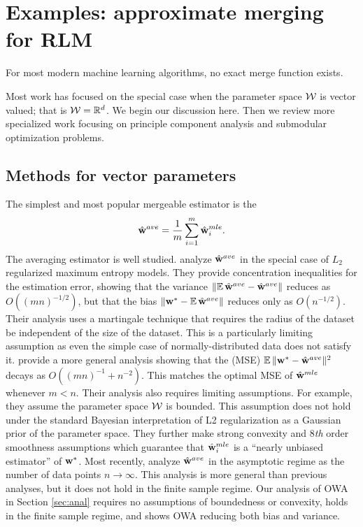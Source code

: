 \documentclass[thesis.tex]{subfiles}
\begin{document}

\section{Examples: approximate merging for RLM}

For most modern machine learning algorithms,
no exact merge function exists.

Most work has focused on the special case when the parameter space ${\mathcal W}$ is vector valued;
that is ${\mathcal W}=\mathbb R^d$.
We begin our discussion here.
Then we review more specialized work focusing on principle component analysis and submodular optimization problems.


\subsection{Methods for vector parameters}
\label{sec:merge:ave}

The simplest and most popular mergeable estimator is the 
\begin{equation}
\hat{\mathbf w}^{ave} = \frac{1}{m}\sum_{i=1}^m \hat{\mathbf w}^{mle}_i
.
\end{equation}
The averaging estimator is well studied.
\citet{mcdonald2009efficient} analyze $\hat{\mathbf w}^{ave}$ in the special case of $L_2$ regularized maximum entropy models.
They provide concentration inequalities for the estimation error,
showing that the variance ${\lVert {\operatorname*{\mathbb E}\hat{\mathbf w}^{ave}-\hat{\mathbf w}^{ave}} \rVert}$ reduces as $O((mn)^{-1/2})$,
but that the bias ${\lVert {{\mathbf w^{*}}-\operatorname*{\mathbb E}\hat{\mathbf w}^{ave}} \rVert}$ reduces only as $O(n^{-1/2})$.
Their analysis uses a martingale technique that requires the radius of the dataset be independent of the size of the dataset.
This is a particularly limiting assumption as even the simple case of
normally-distributed data does not satisfy it.
\citet{zhang2012communication} provide a more general analysis showing that the  (MSE) $\operatorname*{\mathbb E}{\lVert {{\mathbf w^{*}}-\hat{\mathbf w}^{ave}} \rVert}{}^2$ decays as $O((mn)^{-1} + n^{-2})$.
This matches the optimal MSE of $\hat{\mathbf w}^{mle}$ whenever $m<n$.
Their analysis also requires limiting assumptions.
For example, they assume the parameter space ${\mathcal W}$ is bounded.
This assumption does not hold under the standard Bayesian interpretation of L2 regularization as a Gaussian prior of the parameter space.
They further make strong convexity and 8\emph{th} order smoothness assumptions which guarantee that $\hat{\mathbf w}^{mle}_i$ is a ``nearly unbiased estimator'' of ${\mathbf w^{*}}$.
Most recently, \citet{rosenblatt2016optimality} analyze $\hat{\mathbf w}^{ave}$ in the asymptotic regime as the number of data points $n\to\infty$.
This analysis is more general than previous analyses, but it does not hold in the finite sample regime.
Our analysis of OWA in Section \ref{sec:anal} requires no assumptions of boundedness or convexity, holds in the finite sample regime, and shows OWA reducing both bias and variance.
\end{document}
